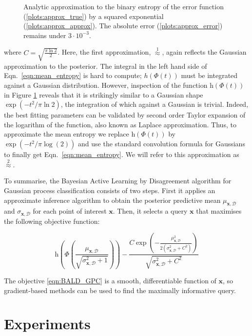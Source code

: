 \documentclass[twoside]{article}
\newcommand{\x}{\bm{x}}
\newcommand{\data}{\mathcal{D}}
\begin{document}
\begin{figure}
\resizebox{3.5in}{!}{}
\caption{Analytic approximation to the binary entropy of the error function (\ref{plots:approx_true}) by a squared exponential (\ref{plots:approx_approx}). The absolute error (\ref{plots:approx_error}) remains under $3\cdot 10^{-3}$.}\label{fig:trick}
\end{figure}

where $C=\sqrt{\frac{\pi\ln2}{2}}$. Here, the first approximation, $\stackrel{1}{\approx}$, again reflects the Gaussian approximation to the posterior. The integral in the left hand side of Eqn.\ \eqref{eqn:mean_entropy} is hard to compute; $h(\Phi(t))$ must be integrated against a Gaussian distribution. However, inspection of the function $\mathrm{h}(\Phi(t))$ in Figure \ref{fig:trick} reveals that it is strikingly similar to a Gaussian shape $\exp(-t^2/\pi\ln2)$, the integration of which against a Gaussian is trivial. Indeed, the best fitting parameters can be validated by second order Taylor expansion of the logarithm of the function, also known as Laplace approximation. Thus, to approximate the mean entropy we replace $\mathrm{h}(\Phi(t))$ by $\exp(-t^2/\pi\log(2))$ and use the standard convolution formula for Gaussians to finally get Eqn.\ \eqref{eqn:mean_entropy}. We will refer to this approximation as $\stackrel{2}{\approx}$.

To summarise, the Bayesian Active Learning by Disagreement algorithm for Gaussian process classification consists of two steps. First it applies an approximate inference algorithm to obtain the posterior predictive mean $\mu_{\x,\data}$ and $\sigma_{\x,\data}$ for each point of interest $\x$. Then, it selects a query $\x$ that maximises the following objective function:

\begin{equation}
	\mathrm{h} \left( \Phi\left( \frac{\mu_{\x,\data}}{\sqrt{\sigma^2_{\x,\data} + 1}} \right)\right) - \frac{C \exp\left(-\frac{\mu_{\x,\data}^2}{2\left(\sigma_{\x,\data}^2 + C^2\right)}\right)}{\sqrt{\sigma_{\x,\data}^2 + C^2}} \tag{BALD-GPC}\label{eqn:BALD_GPC}
\end{equation}

The objective \eqref{eqn:BALD_GPC} is a smooth, differentiable function of $\x$, so gradient-based methods can be used to find the maximally informative query.

\section{Experiments}
\end{document}
